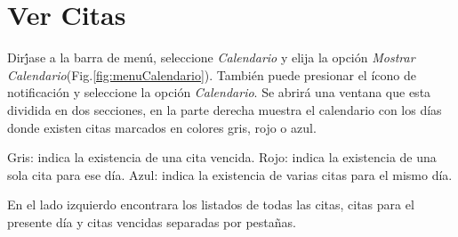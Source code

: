 \section{Ver Citas}
\label{sec:verCita}

Dir\'jase a la barra de men\'u, seleccione \emph{Calendario} y elija la opci\'on \emph{Mostrar Calendario}(Fig.\ref{fig:menuCalendario}). Tambi\'en puede presionar el \'icono de notificaci\'on y seleccione la opci\'on \emph{Calendario}. Se abrir\'a una ventana que esta dividida en dos secciones, en la parte derecha muestra el calendario con los d\'ias donde existen citas marcados en colores gris, rojo o azul. 

Gris: indica la existencia de una cita vencida.
Rojo: indica la existencia de una sola cita para ese d\'ia.
Azul: indica la existencia de varias citas para el mismo d\'ia.


En el lado izquierdo encontrara los listados de todas las citas, citas para el presente d\'ia y citas vencidas separadas por pesta\~nas.
  

